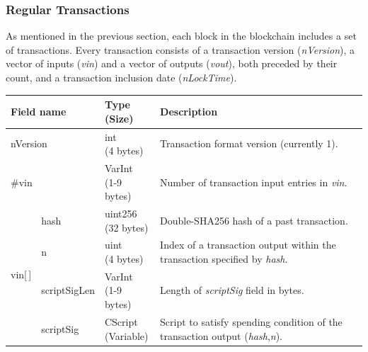 \subsubsection{Regular Transactions} \label{sec:RegularTransactions}
As mentioned in the previous section, each block in the blockchain includes a set of transactions. Every transaction consists of a transaction version (\textit{nVersion}), a vector of inputs (\textit{vin}) and a vector of outputs (\textit{vout}), both preceded by their count, and a transaction inclusion date (\textit{nLockTime}).
\begin{table}[ht!]
	\centering
	\begin{tabular}{ | m{25pt} | m{70pt} | >{\centering} m{60pt} | m{200pt} |}
	
		\hline
		\multicolumn{2}{|l|}{\textbf{Field name}} &
		\bigcell{c}{\textbf{Type} \\ \textbf{(Size)}} &
		\textbf{Description}\\ \hline\hline
    	
    	\multicolumn{2}{|l|}{nVersion} &
    	\bigcell{c}{int \\ (4 bytes)} &
    	Transaction format version (currently 1).\\ \hline
    	
	    \multicolumn{2}{|l|}{\#vin} &
	    \bigcell{c}{VarInt \\ (1-9 bytes)} &
    	Number of transaction input entries in \textit{vin}. \\ \hline
    	
		\multirow{9}{25pt}{\centering vin[\,]} &
		
		hash &
		\bigcell{c}{uint256 \\ (32 bytes)} &
		Double-SHA256 hash of a past transaction.\\ \cline{2-4}
		
		& n &
		\bigcell{c}{uint \\ (4 bytes)} &
		Index of a transaction output within the transaction specified by \textit{hash}. \\ \cline{2-4}

		& scriptSigLen &
		\bigcell{c}{VarInt \\ (1-9 bytes)} &
		Length of \textit{scriptSig} field in bytes. \\ \cline{2-4}
				
		& scriptSig &
		\bigcell{c}{CScript \\ (Variable)} &
		Script to satisfy spending condition of the transaction output (\textit{hash},\textit{n}). \\ \cline{2-4}
		

\end{tabular}
\end{table}
